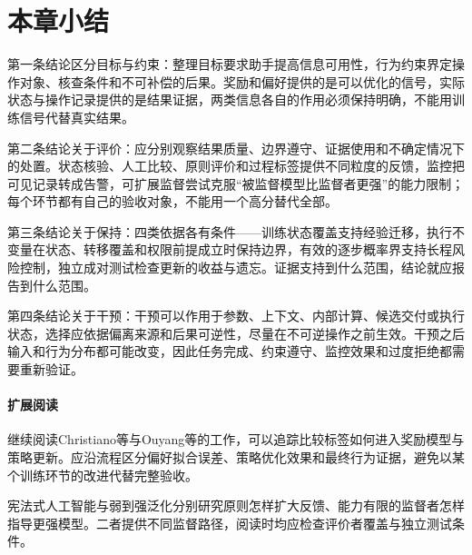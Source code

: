 \section{本章小结}
\label{sec:alignment-summary}

第一条结论区分目标与约束：整理目标要求助手提高信息可用性，行为约束界定操作对象、核查条件和不可补偿的后果。奖励和偏好提供的是可以优化的信号，实际状态与操作记录提供的是结果证据，两类信息各自的作用必须保持明确，不能用训练信号代替真实结果。

第二条结论关于评价：应分别观察结果质量、边界遵守、证据使用和不确定情况下的处置。状态核验、人工比较、原则评价和过程标签提供不同粒度的反馈，监控把可见记录转成告警，可扩展监督尝试克服“被监督模型比监督者更强”的能力限制；每个环节都有自己的验收对象，不能用一个高分替代全部。

第三条结论关于保持：四类依据各有条件——训练状态覆盖支持经验迁移，执行不变量在状态、转移覆盖和权限前提成立时保持边界，有效的逐步概率界支持长程风险控制，独立成对测试检查更新的收益与遗忘。证据支持到什么范围，结论就应报告到什么范围。

第四条结论关于干预：干预可以作用于参数、上下文、内部计算、候选交付或执行状态，选择应依据偏离来源和后果可逆性，尽量在不可逆操作之前生效。干预之后输入和行为分布都可能改变，因此任务完成、约束遵守、监控效果和过度拒绝都需要重新验证。

\paragraph{扩展阅读}

继续阅读Christiano等与Ouyang等的工作，可以追踪比较标签如何进入奖励模型与策略更新。应沿流程区分偏好拟合误差、策略优化效果和最终行为证据，避免以某个训练环节的改进代替完整验收。

宪法式人工智能与弱到强泛化分别研究原则怎样扩大反馈、能力有限的监督者怎样指导更强模型。二者提供不同监督路径，阅读时均应检查评价者覆盖与独立测试条件。

